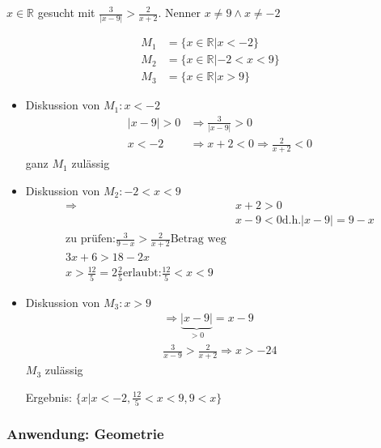 \begin{example}
$x\in \mathbb{R}$ gesucht mit $\frac{3}{|x-9|} > \frac{2}{x+2}$. Nenner $x\neq9 \land x\neq -2$


\begin{align*}
M_1 &= \{x \in \mathbb{R} | x < -2\} \\
M_2 &= \{x \in \mathbb{R} | -2 < x < 9\} \\
M_3 &= \{x \in \mathbb{R} | x > 9\}
\end{align*}

\begin{itemize}
 \item Diskussion von $M_1: x < -2$
\begin{align*}
|x-9|>0 &\Rightarrow \frac{3}{|x-9|} > 0 \\
x<-2 &\Rightarrow x+2<0 \Rightarrow \frac{2}{x+2}<0
\end{align*}
ganz $M_1$ zulässig
 \item Diskussion von $M_2: -2<x<9$
\begin{align*}
\Rightarrow &x+2 > 0 \\
&x-9<0 \textrm{d.h.} |x-9|=9-x \\
\textrm{zu prüfen:}
\frac{3}{9-x} > \frac{2}{x+2} \textrm{Betrag weg} \\
3x+6 > 18-2x \\
x > \frac{12}{5} = 2 \frac{2}{5}
\textrm{erlaubt:} \frac{12}{5}<x<9
\end{align*}
 \item Diskussion von $M_3: x>9$
\begin{align*}
 \Rightarrow \underbrace{|x-9|}_{>0} = x-9 \\
\frac{3}{x-9} > \frac{2}{x+2}
\Rightarrow x>-24
\end{align*}
$M_3$ zulässig

Ergebnis: $\{x|x<-2, \frac{12}{5}<x<9, 9<x\}$
\end{itemize}

\end{example}

\subsubsection*{Anwendung: Geometrie}

